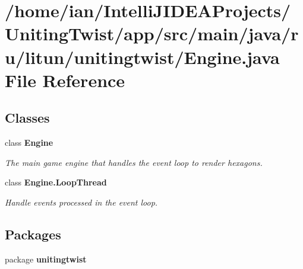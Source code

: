 \section{/home/ian/\+Intelli\+J\+I\+D\+E\+A\+Projects/\+Uniting\+Twist/app/src/main/java/ru/litun/unitingtwist/\+Engine.java File Reference}
\label{_engine_8java}
\subsection*{Classes}
\begin{DoxyCompactItemize}
\item 
class \textbf{ Engine}
\begin{DoxyCompactList}\small\item\em The main game engine that handles the event loop to render hexagons. \end{DoxyCompactList}\item 
class {\bfseries Engine.\+Loop\+Thread}
\begin{DoxyCompactList}\small\item\em Handle events processed in the event loop. \end{DoxyCompactList}\end{DoxyCompactItemize}
\subsection*{Packages}
\begin{DoxyCompactItemize}
\item 
package \textbf{ unitingtwist}
\end{DoxyCompactItemize}
